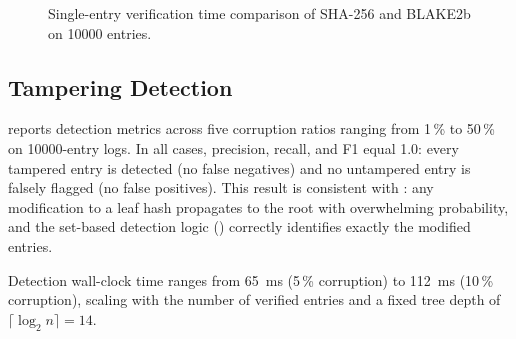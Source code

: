 \documentclass[preprint,12pt]{elsarticle}
\begin{document}
\begin{figure}[t]
\centering
{}
\caption{Single-entry verification time comparison of SHA-256 and BLAKE2b on \num{10000} entries.}
\label{fig:hash_verification}
\end{figure}

\subsection{Tampering Detection}
\label{sec:tamper_results}

 reports detection metrics across five corruption ratios ranging from 1\,\% to 50\,\% on \num{10000}-entry logs.
In all cases, precision, recall, and F1 equal 1.0: every tampered entry is detected (no false negatives) and no untampered entry is falsely flagged (no false positives).
This result is consistent with : any modification to a leaf hash propagates to the root with overwhelming probability, and the set-based detection logic () correctly identifies exactly the modified entries.

Detection wall-clock time ranges from \SI{65}{ms} (5\,\% corruption) to \SI{112}{ms} (10\,\% corruption), scaling with the number of verified entries and a fixed tree depth of $\lceil \log_2 n \rceil = 14$.
\end{document}
